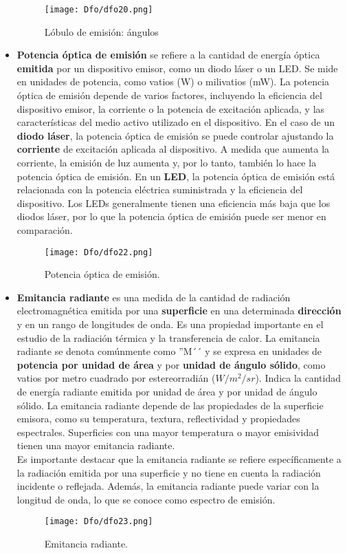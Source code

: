 \documentclass[12pt,fleqn,a4paper,oneside]{LegrandOrangeBook}
\begin{document}
\begin{itemize}
\begin{figure}[H]
\centering
\texttt{[image: Dfo/dfo20.png]}
\caption{Lóbulo de emisión: ángulos}
\end{figure}
\item \textbf{Potencia óptica de emisión}  se refiere a la cantidad de energía óptica \textbf{emitida} por un dispositivo emisor, como un diodo láser o un LED. Se mide en unidades de potencia, como vatios (W) o milivatios (mW). La potencia óptica de emisión depende de varios factores, incluyendo la eficiencia del dispositivo emisor, la corriente o la potencia de excitación aplicada, y las características del medio activo utilizado en el dispositivo. En el caso de un \textbf{diodo láser}, la potencia óptica de emisión se puede controlar ajustando la \textbf{corriente} de excitación aplicada al dispositivo. A medida que aumenta la corriente, la emisión de luz aumenta y, por lo tanto, también lo hace la potencia óptica de emisión. En un \textbf{LED}, la potencia óptica de emisión está relacionada con la potencia eléctrica suministrada y la eficiencia del dispositivo. Los LEDs generalmente tienen una eficiencia más baja que los diodos láser, por lo que la potencia óptica de emisión puede ser menor en comparación.
\begin{figure}[H]
\centering
\texttt{[image: Dfo/dfo22.png]}
\caption{Potencia óptica de emisión.}
\end{figure}

\item \textbf{Emitancia radiante} es una medida de la cantidad de radiación electromagnética emitida por una \textbf{superficie} en una determinada \textbf{dirección} y en un rango de longitudes de onda. Es una propiedad importante en el estudio de la radiación térmica y la transferencia de calor. La emitancia radiante se denota comúnmente como ''M´´ y se expresa en unidades de \textbf{potencia por unidad de área} y por \textbf{unidad de ángulo sólido}, como vatios por metro cuadrado por estereorradián ($W/m^2/sr$). Indica la cantidad de energía radiante emitida por unidad de área y por unidad de ángulo sólido. La emitancia radiante depende de las propiedades de la superficie emisora, como su temperatura, textura, reflectividad y propiedades espectrales. Superficies con una mayor temperatura o mayor emisividad tienen una mayor emitancia radiante.\\
Es importante destacar que la emitancia radiante se refiere específicamente a la radiación emitida por una superficie y no tiene en cuenta la radiación incidente o reflejada. Además, la emitancia radiante puede variar con la longitud de onda, lo que se conoce como espectro de emisión.
\begin{figure}[H]
\centering
\texttt{[image: Dfo/dfo23.png]}
\caption{Emitancia radiante.}
\end{figure}


\end{itemize}
\end{document}
